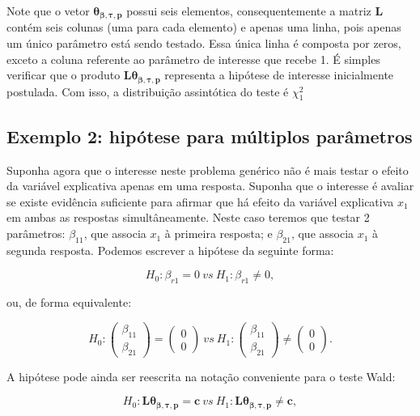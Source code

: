 Note que o vetor $\boldsymbol{\theta_{\beta,\tau,p}}$ possui seis elementos, consequentemente a matriz $\boldsymbol{L}$ contém seis colunas (uma para cada elemento) e apenas uma linha, pois apenas um único parâmetro está sendo testado. Essa única linha é composta por zeros, exceto a coluna referente ao parâmetro de interesse que recebe 1. É simples verificar que o produto $\boldsymbol{L}\boldsymbol{\theta_{\beta,\tau,p}}$ representa a hipótese de interesse inicialmente postulada. Com isso, a distribuição assintótica do teste é $\chi^2_1$

\subsection{Exemplo 2: hipótese para múltiplos parâmetros}\label{sec:ex2}

Suponha agora que o interesse neste problema genérico não é mais testar o efeito da variável explicativa apenas em uma resposta. Suponha que o interesse é avaliar se existe evidência suficiente para afirmar que há efeito da variável explicativa $x_1$ em ambas as respostas simultâneamente. Neste caso teremos que testar 2 parâmetros: $\beta_{11}$, que associa $x_1$ à primeira resposta; e $\beta_{21}$, que associa $x_1$ à segunda resposta. Podemos escrever a hipótese da seguinte forma:

\begin{equation}
\label{eq:hipoteses}
H_0: \beta_{r1} = 0 \ vs \ H_1: \beta_{r1} \neq 0,
\end{equation}

\noindent ou, de forma equivalente:

$$
H_0: 
\begin{pmatrix}
\beta_{11} \\ 
\beta_{21}
\end{pmatrix} 
= 
\begin{pmatrix}
0 \\ 
0
\end{pmatrix}
\ vs \ 
H_1: 
\begin{pmatrix}
\beta_{11} \\ 
\beta_{21}
\end{pmatrix} 
\neq
\begin{pmatrix}
0 \\ 
0 
\end{pmatrix}.
$$

A hipótese pode ainda ser reescrita na notação conveniente para o teste Wald:

\begin{equation}
H_0: \boldsymbol{L}\boldsymbol{\theta_{\beta,\tau,p}} = \boldsymbol{c} \ vs \ H_1: \boldsymbol{L}\boldsymbol{\theta_{\beta,\tau,p}} \neq \boldsymbol{c},
\end{equation}

